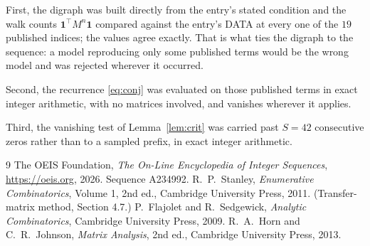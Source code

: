 \documentclass[11pt,a4paper]{article}
\theoremstyle{plain}
\theoremstyle{definition}
\begin{document}
First, the digraph was built directly from the entry's stated condition and the walk counts
$\mathbf{1}^{\!\top}M^{n}\mathbf{1}$ compared against the entry's DATA at every one of
the $19$ published indices; the values agree exactly. That is what ties the digraph to
the sequence: a model reproducing only some published terms would be the wrong model and
was rejected wherever it occurred.

Second, the recurrence \eqref{eq:conj} was evaluated on those published terms in exact
integer arithmetic, with no matrices involved, and vanishes wherever it applies.

Third, the vanishing test of Lemma~\ref{lem:crit} was carried past $S=42$ consecutive
zeros rather than to a sampled prefix, in exact integer arithmetic.

\begin{thebibliography}{9}
 The OEIS Foundation, \emph{The On-Line Encyclopedia of Integer
Sequences}, \url{https://oeis.org}, 2026. Sequence A234992.
 R.~P.~Stanley, \emph{Enumerative Combinatorics}, Volume 1, 2nd ed.,
Cambridge University Press, 2011. (Transfer-matrix method, Section 4.7.)
 P.~Flajolet and R.~Sedgewick, \emph{Analytic Combinatorics}, Cambridge
University Press, 2009.
 R.~A.~Horn and C.~R.~Johnson, \emph{Matrix Analysis}, 2nd ed., Cambridge
University Press, 2013.
\end{thebibliography}
\end{document}
